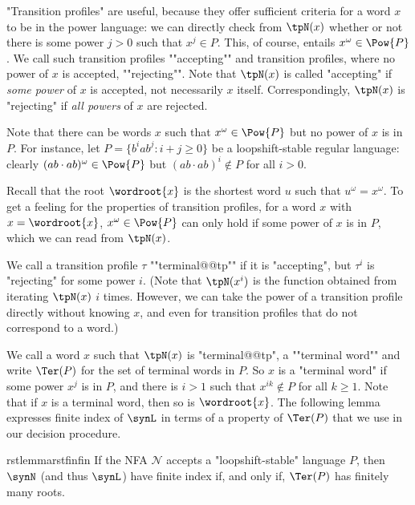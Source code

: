 \documentclass[a4paper,USenglish,cleveref,autoref,thm-restate]{lipics-v2021}
\newcommand{\mc}[1]{\ensuremath{\mathcal{#1}}}
\newcommand{\N}{\mc{N}}
\begin{document}
"Transition profiles" are useful, because they offer sufficient criteria for a word $x$ to be in the power language: we can directly check from $\tpN(x)$ whether or not there is some power $j>0$ such that $x^j \in P$.
This, of course, entails $x^\omega \in \Pow{P}$.
We call such transition profiles \AP ""accepting"" and transition profiles, where no power of $x$ is accepted, ""rejecting"". Note that $\tpN(x)$ is called "accepting" if \textit{some power} of $x$ is accepted, not necessarily $x$ itself. Correspondingly,  $\tpN(x)$ is "rejecting" if \emph{all powers} of $x$ are rejected.

Note that there can be words $x$ such that $x^\omega \in \Pow{P}$ but no power of $x$ is in $P$.
For instance, let $P = \{b^iab^j : i+j \geq 0\}$
be a loopshift-stable regular language:
clearly $(ab\cdot ab)^{\omega} \in \Pow{P}$ but $(ab \cdot ab)^i \notin P$ for all $i > 0$.

Recall that the root $\wordroot{x}$ is the shortest word $u$ such that $u^{\omega}  = x^\omega$.
To get a feeling for the properties of transition profiles, for a word $x$ with $x=\wordroot{x}$, $x^\omega \in \Pow{P}$ can only hold if some power of $x$ is in $P$, which we can read from $\tpN(x)$.

\AP
We call a transition profile $\tau$ ""terminal@@tp"" if it is "accepting", but $\tau^i$ is "rejecting" for some power $i$.
(Note that $\tpN(x^i)$ is the function obtained from iterating $\tpN(x)$ $i$ times. However, we can take the power of a transition profile directly without knowing $x$, and even for transition profiles that do not correspond to a word.)

\AP
We call a word $x$ such that $\tpN(x)$ is "terminal@@tp", a ""terminal word"" and write $\Ter(P)$ for the set of terminal words in $P$. So $x$ is a "terminal word" if some power $x^j$ is in $P$, and there is $i > 1$ such that $x^{ik} \notin P$ for all $k \ge 1$. Note that if $x$ is a terminal word, then so is $\wordroot{x}$.
The following lemma expresses finite index of $\synL$ in terms of a property of $\Ter(P)$ that we use in our decision procedure.

\begin{restatable}{rstlemma}{rstfinfin}
  \label{lem:fin2fin}
  If the NFA $\N$ accepts a "loopshift-stable" language $P$, then $\synN$ (and thus $\synL$) have finite index if, and only if, $\Ter(P)$ has finitely many roots.
\end{restatable}
\end{document}
